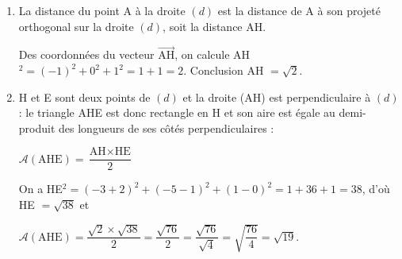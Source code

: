 \documentclass[10pt]{article}
\providecommand{\vect}[1]{\overrightarrow{#1}}
\begin{document}
\begin{enumerate}
\begin{enumerate}
			et $\vect{\text{AH}} \cdot \vect{\delta} = - 1 + 0 + 1 = 0$, ce qui montre que les vecteurs $\vect{\text{AH}}$ et $\vect{\delta}$ sont orthogonaux donc que les droites (AH) et ($d$) sont perpendiculaires.

			Le point H est le projeté orthogonal de A sur $(d)$.

			\item La distance du point A à la droite $(d)$ est la distance de A à son projeté orthogonal sur la droite $(d)$, soit la distance AH.

			Des coordonnées du vecteur $\vect{\text{AH}}$, on calcule AH$^2 = (- 1)^2 + 0^2 + 1^2 = 1 + 1 = 2$. Conclusion AH $ = \sqrt 2$.

			\item H et E sont deux points de $(d)$ et la droite (AH) est perpendiculaire à $(d)$ : le triangle AHE est donc rectangle en H et son aire est égale au demi-produit des longueurs de ses côtés perpendiculaires :

			$\mathcal{A}(\text{AHE}) = \dfrac{\text{AH} \times \text{HE}}{2}$

			On a HE$^2 = (- 3 + 2)^2 + (- 5 - 1)^2 + (1 - 0)^2 = 1 + 36 + 1 = 38$, d'où HE $ = \sqrt{38}$ et

			$\mathcal{A}(\text{AHE}) = \dfrac{\sqrt 2 \times \sqrt{38}}{2} = \dfrac{\sqrt{76}}{2} = \dfrac{\sqrt{76}}{\sqrt4} = \sqrt{\dfrac{76}{4}} = \sqrt{19}$.
		\end{enumerate}
	\end{enumerate}
\end{document}
